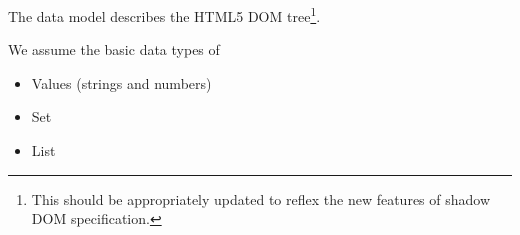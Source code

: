 \documentclass{article}
\begin{document}
The data model describes the HTML5 DOM tree\footnote{
This should be appropriately updated to reflex the new features of shadow DOM
specification.}.

We assume the basic data types of 
\begin{itemize}
\item Values (strings and numbers)
\item Set
\item List
\end{itemize}
\end{document}
